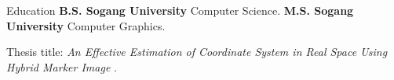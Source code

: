 \begin{rubric}{Education}
\entry*[2014.02 -- 2018.02]%
	\textbf{B.S. Sogang University} Computer Science.
%
\entry*[2018.02 -- 2020.02]%
	\textbf{M.S. Sogang University} Computer Graphics.\par
	Thesis title: \emph{An Effective Estimation of Coordinate System in Real Space Using Hybrid Marker Image
}.
% 
\end{rubric}